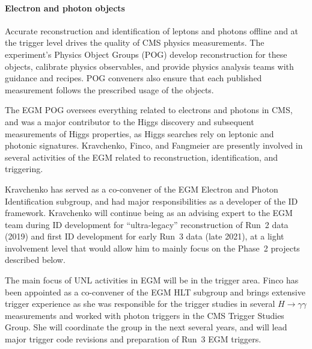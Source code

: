 \paragraph{Electron and photon objects}
Accurate reconstruction and identification of leptons and photons offline and at the trigger level drives the quality of CMS physics measurements. The experiment's Physics Object Groups (POG) develop reconstruction for these objects, calibrate physics observables, and provide  physics analysis teams  with guidance and recipes. POG conveners also ensure that each published measurement follows the prescribed usage of the objects. 

The EGM POG oversees everything related to electrons and photons in CMS, and was a major contributor to the Higgs discovery and subsequent measurements of Higgs properties, as Higgs searches rely on leptonic and photonic signatures. Kravchenko, Finco, and Fangmeier are presently involved in several activities of the EGM related to reconstruction, identification, and triggering.

Kravchenko has served as a co-convener of the EGM Electron and Photon Identification subgroup, and had major responsibilities as a developer of the ID framework. 
Kravchenko will continue being as an advising expert to the EGM team during ID development for ``ultra-legacy'' reconstruction of Run~2 data (2019) and first ID development for early Run~3 data (late 2021), at a light involvement level that would allow him to mainly focus on the Phase~2 projects described below.


The main focus of UNL activities in EGM will be in the trigger area. Finco has been appointed as a co-convener of the EGM HLT subgroup and brings extensive trigger experience as she was responsible for the trigger studies in several $H\to\gamma\gamma$ measurements and worked with photon triggers in the CMS Trigger Studies Group. She will coordinate the group in the next several years, and will lead major trigger code revisions and preparation of Run~3 EGM triggers.

